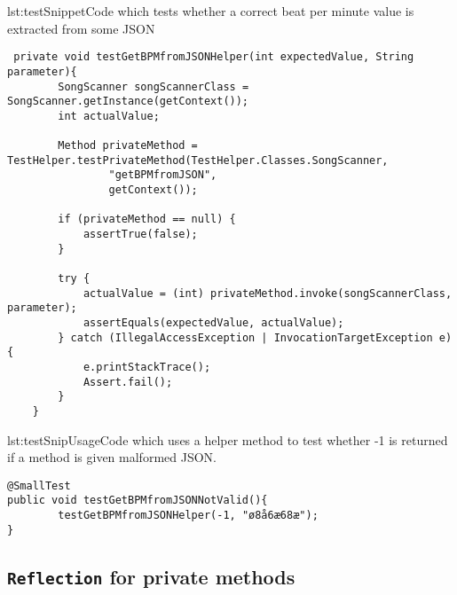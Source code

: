 \begin{code}{lst:testSnippet}{Code which tests whether a correct beat per minute value is extracted from some JSON}
\begin{lstlisting}
 private void testGetBPMfromJSONHelper(int expectedValue, String parameter){
        SongScanner songScannerClass = SongScanner.getInstance(getContext());
        int actualValue;

        Method privateMethod = TestHelper.testPrivateMethod(TestHelper.Classes.SongScanner,
                "getBPMfromJSON",
                getContext());

        if (privateMethod == null) {
            assertTrue(false);
        }

        try {
            actualValue = (int) privateMethod.invoke(songScannerClass, parameter);
            assertEquals(expectedValue, actualValue);
        } catch (IllegalAccessException | InvocationTargetException e) {
            e.printStackTrace();
            Assert.fail();
        }
    }
\end{lstlisting}
\end{code}
\begin{code}{lst:testSnipUsage}{Code which uses a helper method to test whether -1 is returned if a method is given malformed JSON.}
\begin{lstlisting}
@SmallTest
public void testGetBPMfromJSONNotValid(){
        testGetBPMfromJSONHelper(-1, "ø8å6æ68æ");
}
\end{lstlisting}
\end{code}

\subsection{\texttt{Reflection} for private methods}\label{sec:privTest}